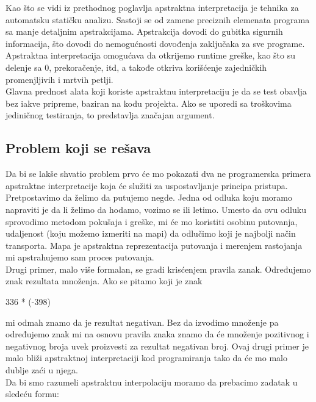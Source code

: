 
Kao što se vidi iz prethodnog poglavlja apstraktna interpretacija je tehnika za automatsku statičku analizu. Sastoji se od zamene preciznih elemenata programa sa manje detaljnim apstrakcijama. Apstrakcija dovodi do gubitka sigurnih informacija, što dovodi do nemogućnosti dovođenja zaključaka za sve programe. Apstraktna interpretacija omogućava da otkrijemo runtime greške, kao što su delenje sa 0, prekoračenje, itd, a takođe otkriva korišćenje zajedničkih promenjljivih i mrtvih petlji. \cite{AbramskyHankin}\\ 
Glavna prednost alata koji koriste apstraktnu interpretaciju je da se test obavlja bez iakve pripreme, baziran na kodu projekta. Ako se uporedi sa troškovima jediničnog testiranja, to predstavlja značajan argument. \cite{AbramskyHankin} \\


\subsection{Problem koji se rešava}
\label{subsec:problem1}
Da bi se lakše shvatio problem prvo će mo pokazati dva ne programerska primera apstraktne interpretacije koja će služiti za uspostavljanje principa pristupa. \\

Pretpostavimo da želimo da putujemo negde. Jedna od odluka koju moramo napraviti je da li želimo da hodamo, vozimo se ili letimo. Umesto da ovu odluku sprovodimo metodom pokušaja i greške, mi će mo koristiti osobinu putovanja, udaljenost (koju možemo izmeriti na mapi) da odlučimo koji je najbolji način transporta. Mapa je apstraktna reprezentacija putovanja i merenjem rastojanja mi apstrahujemo sam proces putovanja. \\

Drugi primer, malo više formalan, se gradi krisćenjem pravila zanak. Određujemo znak rezultata množenja. Ako se pitamo koji je znak

336 * (-398)  

mi odmah znamo da je rezultat negativan. Bez da izvodimo množenje pa određujemo znak mi na osnovu pravila znaka znamo da će množenje pozitivnog i negativnog broja uvek proizvesti za rezultat negativan broj. Ovaj drugi primer je malo bliži apstraktnoj interpretaciji kod programiranja tako da će mo malo dublje zaći u njega. \\

Da bi smo razumeli apstraktnu interpolaciju moramo da prebacimo zadatak u sledeću formu:

